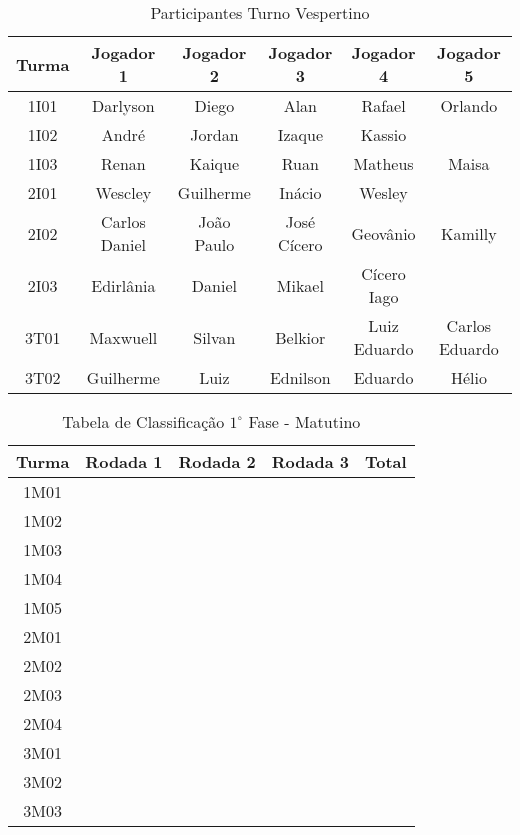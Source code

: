 \documentclass[10pt]{article}
\begin{document}
    \begin{table}[h!]
        \caption{Participantes Turno Vespertino}
        \label{tab:part-vespertino}
        \begin{center}
            \begin{tabular}{c|c|c|c|c|c}
                \hline
                \textbf{Turma} & \textbf{Jogador 1} & \textbf{Jogador 2} & \textbf{Jogador 3} & \textbf{Jogador 4} & \textbf{Jogador 5}\\ \hline
                1I01 & Darlyson & Diego & Alan & Rafael & Orlando \\
                1I02 & André & Jordan & Izaque & Kassio & \\
                1I03 & Renan & Kaique & Ruan & Matheus & Maisa \\
                2I01 & Wescley & Guilherme & Inácio & Wesley & \\
                2I02 & Carlos Daniel & João Paulo & José Cícero & Geovânio & Kamilly \\
                2I03 & Edirlânia & Daniel & Mikael & Cícero Iago \\
                3T01 & Maxwuell & Silvan & Belkior & Luiz Eduardo & Carlos Eduardo \\
                3T02 & Guilherme & Luiz & Ednilson & Eduardo & Hélio \\
                \hline
            \end{tabular}
        \end{center}
    \end{table}

    \begin{table}[H]
        \caption{Tabela de Classificação $1^\circ$ Fase - Matutino}
        \label{tab:tab-matutino}
        \begin{center}
            \begin{tabular}{|c|c|c|c|c|}
                \hline
                \textbf{Turma} & \textbf{Rodada 1} & \textbf{Rodada 2} & \textbf{Rodada 3} & \textbf{Total} \\ \hline
                1M01 & & & & \\ \hline
                1M02 & & & & \\ \hline
                1M03 & & & & \\ \hline
                1M04 & & & & \\ \hline
                1M05 & & & & \\ \hline
                2M01 & & & & \\ \hline
                2M02 & & & & \\ \hline
                2M03 & & & & \\ \hline
                2M04 & & & & \\ \hline
                3M01 & & & & \\ \hline
                3M02 & & & & \\ \hline
                3M03 & & & & \\
                \hline
            \end{tabular}
        \end{center}
    \end{table}
\end{document}
